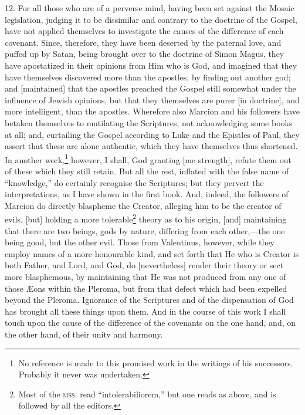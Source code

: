 12. For all those who are of a perverse mind, having been set against the Mosaic legislation, judging it to be dissimilar and contrary to the doctrine of the Gospel, have not applied themselves to investigate the causes of the difference of each covenant. Since, therefore, they have been deserted by the paternal love, and puffed up by Satan, being brought over to the doctrine of Simon Magus, they have apostatized in their opinions from Him who is God, and imagined that they have themselves discovered more than the apostles, by finding out another god; and [maintained] that the apostles preached the Gospel still somewhat under the influence of Jewish opinions, but that they themselves are purer [in doctrine], and more intelligent, than the apostles. Wherefore also Marcion and his followers have betaken themselves to mutilating the Scriptures, not acknowledging some books  at all; and, curtailing the Gospel according to Luke and the Epistles of Paul, they assert that these are alone authentic, which they have themselves thus shortened. In another work,\footnote{No reference is made to this promised work in the writings of his successors. Probably it never was undertaken.} however, I shall, God granting [me strength], refute them out of these which they still retain. But all the rest, inflated with the false name of “knowledge,” do certainly recognise the Scriptures; but they pervert the interpretations, as I have shown in the first book. And, indeed, the followers of Marcion do directly blaspheme the Creator, alleging him to be the creator of evils, [but] holding a more tolerable\footnote{Most of the \textsc{mss.} read “intolerabiliorem,” but one reads as above, and is followed by all the editors.} theory as to his origin, [and] maintaining that there are two beings, gods by nature, differing from each other,—the one being good, but the other evil. Those from Valentinus, however, while they employ names of a more honourable kind, and set forth that He who is Creator is both Father, and Lord, and God, do [nevertheless] render their theory or sect more blasphemous, by maintaining that He was not produced from any one of those Æons within the Pleroma, but from that defect which had been expelled beyond the Pleroma. Ignorance of the Scriptures and of the dispensation of God has brought all these things upon them. And in the course of this work I shall touch upon the cause of the difference of the covenants on the one hand, and, on the other hand, of their unity and harmony.

